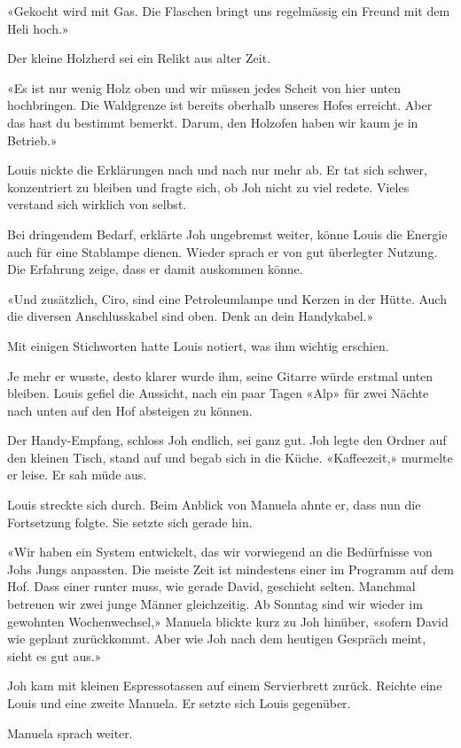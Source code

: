 «Gekocht wird mit Gas. Die Flaschen bringt uns regelmässig ein Freund
mit dem Heli hoch.»

Der kleine Holzherd sei ein Relikt aus alter Zeit.

«Es ist nur wenig Holz oben und wir müssen jedes Scheit von hier unten
hochbringen. Die Waldgrenze ist bereits oberhalb unseres Hofes erreicht.
Aber das hast du bestimmt bemerkt. Darum, den Holzofen haben wir kaum je
in Betrieb.»

Louis nickte die Erklärungen nach und nach nur mehr ab. Er tat sich
schwer, konzentriert zu bleiben und fragte sich, ob Joh nicht zu viel
redete. Vieles verstand sich wirklich von selbst.

Bei dringendem Bedarf, erklärte Joh ungebremst weiter, könne Louis die
Energie auch für eine Stablampe dienen. Wieder sprach er von gut
überlegter Nutzung. Die Erfahrung zeige, dass er damit auskommen könne.

«Und zusätzlich, Ciro, sind eine Petroleumlampe und Kerzen in der Hütte.
Auch die diversen Anschlusskabel sind oben. Denk an dein Handykabel.»

Mit einigen Stichworten hatte Louis notiert, was ihm wichtig erschien.

Je mehr er wusste, desto klarer wurde ihm, seine Gitarre würde erstmal
unten bleiben. Louis gefiel die Aussicht, nach ein paar Tagen «Alp» für
zwei Nächte nach unten auf den Hof absteigen zu können.

Der Handy-Empfang, schloss Joh endlich, sei ganz gut. Joh legte den
Ordner auf den kleinen Tisch, stand auf und begab sich in die Küche.
«Kaffeezeit,» murmelte er leise. Er sah müde aus.

Louis streckte sich durch. Beim Anblick von Manuela ahnte er, dass nun
die Fortsetzung folgte. Sie setzte sich gerade hin.

«Wir haben ein System entwickelt, das wir vorwiegend an die Bedürfnisse
von Johs Jungs anpassten. Die meiste Zeit ist mindestens einer im
Programm auf dem Hof. Dass einer runter muss, wie gerade David,
geschieht selten. Manchmal betreuen wir zwei junge Männer gleichzeitig.
Ab Sonntag sind wir wieder im gewohnten Wochenwechsel,» Manuela blickte
kurz zu Joh hinüber, «sofern David wie geplant zurückkommt. Aber wie Joh
nach dem heutigen Gespräch meint, sieht es gut aus.»

Joh kam mit kleinen Espressotassen auf einem Servierbrett zurück.
Reichte eine Louis und eine zweite Manuela. Er setzte sich Louis
gegenüber.

Manuela sprach weiter.


